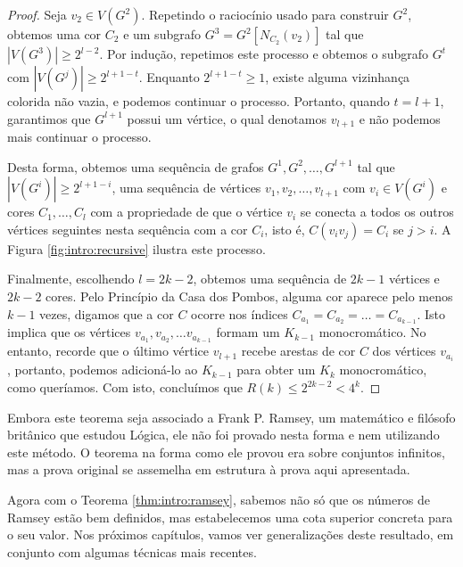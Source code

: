 \begin{proof}
Seja $v_2 \in V(G^2)$. Repetindo o raciocínio usado para construir $G^2$, obtemos uma cor $C_2$ e um subgrafo $G^3 = G^2[N_{C_2}(v_2)]$ tal que $|V(G^3)| \geq 2^{l-2}$. Por indução, repetimos este processo e obtemos o subgrafo $G^t$ com $|V(G^j)| \geq 2^{l+1-t}$. Enquanto $2^{l+1-t} \geq 1$, existe alguma vizinhança colorida não vazia, e podemos continuar o processo. Portanto, quando $t = l+1$, garantimos que $G^{l+1}$ possui um vértice, o qual denotamos $v_{l+1}$ e não podemos mais continuar o processo.

Desta forma, obtemos uma sequência de grafos $G^1, G^2, \dots, G^{l+1}$ tal que $|V(G^i)| \geq 2^{l+1-i}$, uma sequência de vértices $v_1, v_2, \dots, v_{l+1}$ com $v_i \in V(G^i)$ e cores $C_1, \dots, C_l$ com a propriedade de que o vértice $v_i$ se conecta a todos os outros vértices seguintes nesta sequência com a cor $C_i$, isto é, $C(v_i v_j) = C_i$ se $j > i$. A Figura \ref{fig:intro:recursive} ilustra este processo.

Finalmente, escolhendo $l = 2k - 2$, obtemos uma sequência de $2k - 1$ vértices e $2k - 2$ cores. Pelo Princípio da Casa dos Pombos, alguma cor aparece pelo menos $k - 1$ vezes, digamos que a cor $C$ ocorre nos índices $C_{a_1} =  C_{a_2} = \dots = C_{a_{k-1}}$. Isto implica que os vértices $v_{a_1}, v_{a_2}, \dots v_{a_{k-1}}$ formam um $K_{k-1}$ monocromático.
No entanto, recorde que o último vértice $v_{l+1}$ recebe arestas de cor $C$ dos vértices $v_{a_{i}}$, portanto, podemos adicioná-lo ao $K_{k-1}$ para obter um $K_k$ monocromático, como queríamos. Com isto, concluímos que $R(k) \leq 2^{2k - 2} < 4^k$.
\end{proof}

Embora este teorema seja associado a Frank P. Ramsey, um matemático e filósofo britânico que estudou Lógica, ele não foi provado nesta forma e nem utilizando este método. O teorema na forma como ele provou \cite{ramsey} era sobre conjuntos infinitos, mas a prova original se assemelha em estrutura à prova aqui apresentada.

Agora com o Teorema \ref{thm:intro:ramsey}, sabemos não só que os números de Ramsey estão bem definidos, mas estabelecemos uma cota superior concreta para o seu valor. Nos próximos capítulos, vamos ver generalizações deste resultado, em conjunto com algumas técnicas mais recentes.

